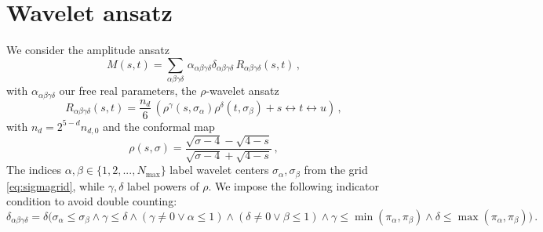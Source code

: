 \section*{Wavelet ansatz}
We consider the amplitude ansatz
\begin{equation}
M(s,t)=\sum_{\alpha\beta\gamma\delta}\,\alpha_{\alpha\beta\gamma\delta}\delta_{\alpha\beta\gamma\delta}\,R_{\alpha\beta\gamma\delta}(s,t)\,,
\end{equation}
with $\alpha_{\alpha\beta\gamma\delta}$ our free real parameters, the $\rho$-wavelet ansatz
\begin{equation}
R_{\alpha\beta\gamma\delta}(s,t)=\frac{n_d}{6}\,\left(\rho^\gamma(s,\sigma_\alpha)\rho^\delta(t,\sigma_\beta)+ s \leftrightarrow t \leftrightarrow u \right)\,, 
\end{equation}
with $n_d=2^{5-d}n_{d,0}$ and the conformal map 
\begin{equation}
\rho(s,\sigma)=\frac{\sqrt{\sigma-4}-\sqrt{4-s}}{\sqrt{\sigma-4}+\sqrt{4-s}}\,,
\label{eq:confmap}
\end{equation}
The indices $\alpha,\beta\in \{1,2,...,N_{\mathrm{max}}\}$ label wavelet centers $\sigma_\alpha,\sigma_\beta$ from the grid \eqref{eq:sigmagrid}, while $\gamma,\delta$ label powers of $\rho$. We impose the following indicator condition to avoid double counting:
\begin{equation}
\delta_{\alpha\beta\gamma\delta}=\delta\big(
\sigma_\alpha\leq\sigma_\beta \land 
\gamma\leq \delta \land 
(\gamma\neq0 \lor \alpha\leq 1) \land 
(\delta\neq0 \lor \beta\leq 1) \land
\gamma\leq \min(\pi_\alpha,\pi_\beta) \land
\delta\leq \max(\pi_\alpha,\pi_\beta)
\big)\,.
\end{equation}




